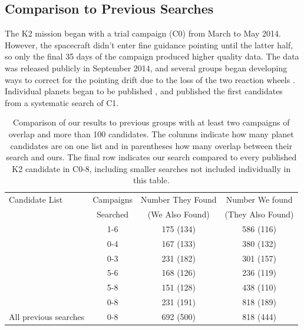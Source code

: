 \documentclass[twocolumn]{aastex62}
\begin{document}
\subsection{Comparison to Previous Searches}
\label{previous}

The K2 mission began with a trial campaign (C0) from March to May
2014. However, the spacecraft didn't enter fine guidance pointing
until the latter half, so only the final 35 days of the campaign
produced higher quality data. The data was released publicly in
September 2014, and several groups began developing ways to correct
for the pointing drift due to the loss of the two reaction wheels
\citep{van14, lun15}. Individual planets began to be published
\citep[e.g.][]{pet15}, and \cite{for15} published the first candidates
from a systematic search of C1.

\begin{table}[tbp]
\caption{Comparison of our results to previous groups with at least
  two campaigns of overlap and more than 100 candidates. The columns
  indicate how many planet candidates are on one list and in
  parentheses how many overlap between their search and ours. The
  final row indicates our search compared to every published K2
  candidate in C0-8, including smaller searches not included
  individually in this table.
  \label{tab:compare}}
\centering
\begin{tabular}{| l c c c |}
\hline
Candidate List  & Campaigns & Number They Found & Number We found  \\
 & Searched  & (We Also Found) & (They Also Found) \\
\hline
\cite{bar16a} & 1-6 & 175 (134) & 586 (116) \\ 
\hline
\cite{cro16} & 0-4 & 167 (133) & 380 (132) \\
\hline
\cite{van16b} & 0-3 & 231 (182) & 301 (157) \\
\hline
\cite{pop16} & 5-6 & 168 (126) & 236 (119) \\ 
\hline
\cite{pet18} & 5-8 & 151 (128) & 438 (110) \\ 
\hline
\cite{may18} & 0-8 & 231 (191) & 818 (189) \\ 
\hline
All previous searches\tablenotemark{a} & 0-8 & 692 (500) & 818 (444) \\ 
\hline
\end{tabular}
\end{table}
\end{document}
